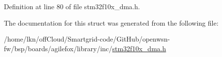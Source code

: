 Definition at line 80 of file stm32f10x\+\_\+dma.\+h.



The documentation for this struct was generated from the following file\+:\begin{DoxyCompactItemize}
\item 
/home/lkn/off\+Cloud/\+Smartgrid-\/code/\+Git\+Hub/openwsn-\/fw/bsp/boards/agilefox/library/inc/\hyperlink{agilefox_2library_2inc_2stm32f10x__dma_8h}{stm32f10x\+\_\+dma.\+h}\end{DoxyCompactItemize}
